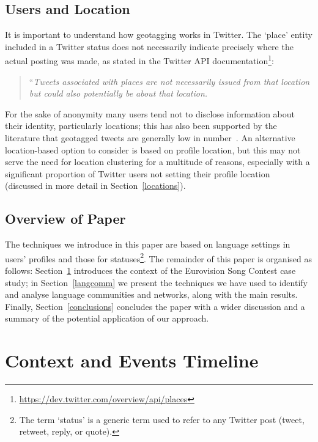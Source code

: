 \documentclass[conference]{IEEEtran}
\begin{document}
\subsection{Users and Location}

It is important to understand how geotagging works in Twitter. The
`place' entity included in a Twitter status does not necessarily
indicate precisely where the actual posting was made, as stated in the
Twitter API
documentation\footnote{\url{https://dev.twitter.com/overview/api/places}}:

\begin{quotation} ``{\emph{Tweets associated with places are not
necessarily issued from that location but could also potentially be
about that location.}}
\end{quotation}

For the sake of anonymity many users tend not to disclose information
about their identity, particularly locations; this has also been
supported by the literature that geotagged tweets are generally low in
number~\cite{kang-et-al:2013}. An alternative location-based option to
consider is based on profile location, but this may not serve the need
for location clustering for a multitude of reasons, especially with a
significant proportion of Twitter users not setting their profile
location~\cite{graham-et-al:2014} (discussed in more detail in
Section~\ref{locations}).

\subsection{Overview of Paper}

The techniques we introduce in this paper are based on language
settings in users' profiles and those for statuses\footnote{The term
`status' is a generic term used to refer to any Twitter post (tweet,
retweet, reply, or quote).}. The remainder of this paper is organised
as follows: Section~\ref{context} introduces the context of the
Eurovision Song Contest case study; in Section~\ref{langcomm} we
present the techniques we have used to identify and analyse language
communities and networks, along with the main results. Finally,
Section~\ref{conclusions} concludes the paper with a wider discussion
and a summary of the potential application of our approach.


\section{Context and Events Timeline}\label{context}
\end{document}
